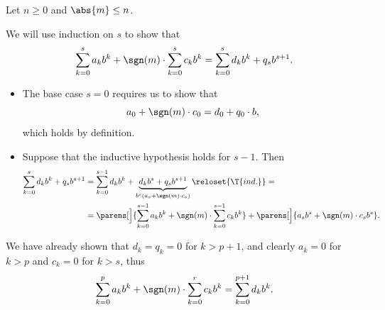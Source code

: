 \begin{defproof}
   Let \( n \geq 0 \) and \( \abs{m} \leq n \).

  We will use induction on \( s \) to show that
  \begin{equation*}
    \sum_{k=0}^s a_k b^k + \sgn(m) \cdot \sum_{k=0}^s c_k b^k = \sum_{k=0}^s d_k b^k + q_s b^{s+1}.
  \end{equation*}

  \begin{itemize}
    \item The base case \( s = 0 \) requires us to show that
    \begin{equation*}
      a_0 + \sgn(m) \cdot c_0 = d_0 + q_0 \cdot b,
    \end{equation*}
    which holds by definition.

    \item Suppose that the inductive hypothesis holds for \( s - 1 \). Then
    \begin{align*}
      \sum_{k=0}^s d_k b^k + q_s b^{s+1}
      &=
      \sum_{k=0}^{s-1} d_k b^k + \underbrace{d_k b^s + q_s b^{s+1}}_{b^s(a_s + \sgn(m) \cdot c_s)}
      \reloset{\T{ind.}} = \\ &=
      \parens[\Big]{ \sum_{k=0}^{s-1} a_k b^k + \sgn(m) \cdot \sum_{k=0}^{s-1} c_k b^k } + \parens[\Big]{ a_s b^s + \sgn(m) \cdot c_s b^s }.
    \end{align*}
  \end{itemize}

  We have already shown that \( d_k = q_k = 0 \) for \( k > p + 1 \), and clearly \( a_k = 0 \) for \( k > p \) and \( c_k = 0 \) for \( k > s \), thus
  \begin{equation*}
    \sum_{k=0}^p a_k b^k + \sgn(m) \cdot \sum_{k=0}^r c_k b^k = \sum_{k=0}^{p + 1} d_k b^k.
  \end{equation*}
\end{defproof}

